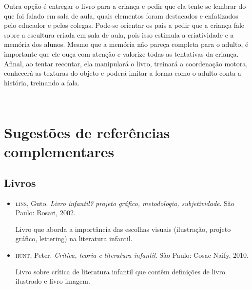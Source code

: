 \documentclass[11pt]{extarticle}
\begin{document}
\begin{enumerate}

Outra opção é entregar o livro para a criança e pedir que ela tente se lembrar
do que foi falado em sala de aula, quais elementos foram destacados e enfatizados pelo educador e pelos colegas. Pode-se orientar os pais a pedir que a criança fale sobre a escultura criada em sala de aula, pois isso estimula a criatividade e a memória dos alunos. Mesmo que a memória não pareça 
completa para o adulto, é importante que ele ouça com atenção e 
valorize todas as tentativas da criança. Afinal, ao tentar recontar, 
ela manipulará o livro, treinará a coordenação motora, conhecerá as texturas 
do objeto e poderá imitar a forma como o adulto 
conta a história, treinando a fala. 
\end{enumerate}

 
\section{Sugestões de referências complementares}

\subsection{Livros} 

\begin{itemize}
\item \textsc{lins}, Guto. \textit{Livro infantil? projeto gráfico, metodologia, subjetividade}. São Paulo: Rosari, 2002.

Livro que aborda a importância das escolhas visuais (ilustração, projeto gráfico, lettering) na literatura infantil.  

\item \textsc{hunt}, Peter. \textit{Crítica, teoria e literatura infantil}. São Paulo: Cosac Naify, 2010.

Livro sobre crítica de literatura infantil que contêm definições de livro ilustrado e livro imagem. 
\end{itemize}
\end{document}
